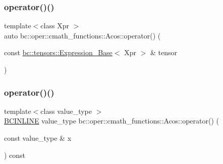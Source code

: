 \mbox{\label{structbc_1_1oper_1_1cmath__functions_1_1Acos_aa8deed857a666abbe71c4a06efef2469}} 
\subsubsection{\texorpdfstring{operator()()}{operator()()}\hspace{0.1cm}{\footnotesize\ttfamily [2/3]}}
{\footnotesize\ttfamily template$<$class Xpr $>$ \\
auto bc\+::oper\+::cmath\+\_\+functions\+::\+Acos\+::operator() (\begin{DoxyParamCaption}\item[{const \hyperlink{classbc_1_1tensors_1_1Expression__Base}{bc\+::tensors\+::\+Expression\+\_\+\+Base}$<$ Xpr $>$ \&}]{tensor }\end{DoxyParamCaption})\hspace{0.3cm}{\ttfamily [inline]}}

\mbox{\label{structbc_1_1oper_1_1cmath__functions_1_1Acos_a32904dc6e91d12cb71f427641bc1838d}} 
\subsubsection{\texorpdfstring{operator()()}{operator()()}\hspace{0.1cm}{\footnotesize\ttfamily [3/3]}}
{\footnotesize\ttfamily template$<$class value\+\_\+type $>$ \\
\hyperlink{common_8h_a6699e8b0449da5c0fafb878e59c1d4b1}{B\+C\+I\+N\+L\+I\+NE} value\+\_\+type bc\+::oper\+::cmath\+\_\+functions\+::\+Acos\+::operator() (\begin{DoxyParamCaption}\item[{const value\+\_\+type \&}]{x }\end{DoxyParamCaption}) const\hspace{0.3cm}{\ttfamily [inline]}}



